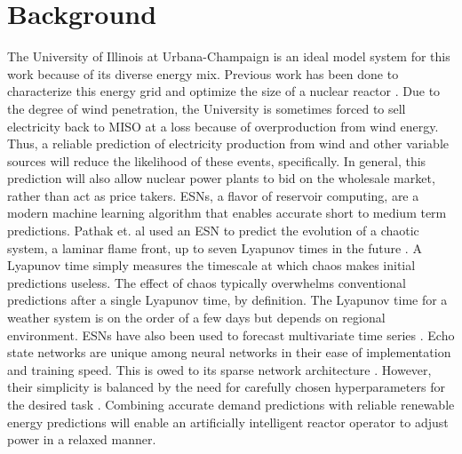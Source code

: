 \section{Background}
The University of Illinois at Urbana-Champaign is an ideal model system for
this work because of its diverse energy mix. Previous work has been done to
characterize this energy grid and optimize the size of a nuclear reactor \cite{dotson_optimal_2020}. Due to the degree of wind penetration, the University is sometimes
forced to sell electricity back to MISO at a loss because of overproduction
from wind energy. Thus, a reliable prediction of electricity production from
wind and other variable sources will reduce the likelihood of these events,
specifically. In general, this prediction will also allow nuclear power plants
to bid on the wholesale market, rather than act as price takers.
\acrshort{ESN}s, a flavor of reservoir computing, are a modern
machine learning algorithm that enables accurate short
to medium term predictions. Pathak et. al used an \acrshort{ESN} to predict the
evolution of a chaotic system, a laminar flame front, up to seven Lyapunov
times in the future \cite{pathak_model-free_2018, wikner_combining_2020}. A
Lyapunov time simply measures the timescale at which chaos makes initial
predictions useless. The effect of chaos typically overwhelms conventional
predictions after a single Lyapunov time, by definition.
The Lyapunov time for a weather system is on the order of a few days but
depends on regional environment. \acrshort{ESN}s have also been used to
forecast multivariate time series
\cite{bianchi_reservoir_2020}. Echo state networks are unique among neural
networks in their ease of implementation and training speed. This is owed to its
sparse network architecture \cite{pathak_model-free_2018,
wikner_combining_2020, vannitsem_predictability_2017}. However,
their simplicity is balanced by the need for carefully chosen hyperparameters
for the desired task \cite{lukosevicius_practical_2012}.
Combining accurate demand predictions with reliable
renewable energy predictions will enable an artificially intelligent reactor
operator to adjust power in a relaxed manner.
